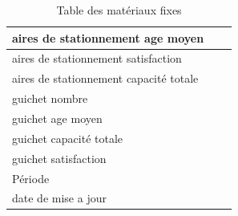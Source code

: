 \documentclass[a4paper]{report}
\begin{document}
\begin{doublespace}
\begin{table}[H]
\begin{center}
\begin{tabularx}{17.5cm}{|X|p{3cm}|p{1.5cm}|}
				\hline
				aires de stationnement age moyen       &                        &                  \\
				\hline
				aires de stationnement satisfaction    &                        &                  \\
				\hline
				aires de stationnement capacité totale &                        &                  \\
				\hline
				guichet nombre                         &                        &                  \\
				\hline
				guichet age moyen                      &                        &                  \\
				\hline
				guichet capacité totale                &                        &                  \\
				\hline
				guichet satisfaction                   &                        &                  \\
				\hline
				Période                                &                        &                  \\
				\hline
				date de mise a jour                    &                        &                  \\
				\hline
			\end{tabularx}
			\caption{Table des matériaux fixes}
		\end{center}
	\end{table}


\end{doublespace}
\end{document}
